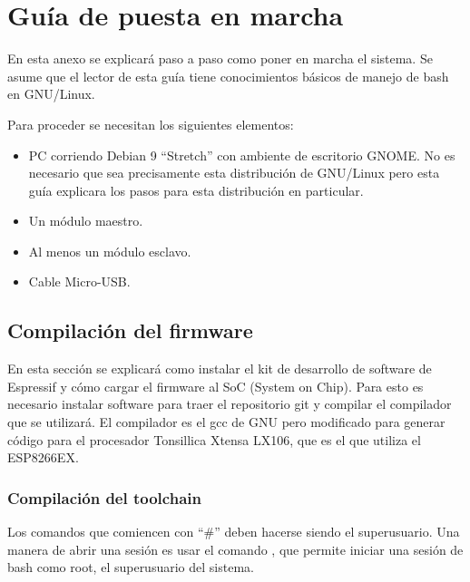 \lstset {
	numbers=none,
	frame=none
}
\setcounter{figure}{0}
\section{Guía de puesta en marcha}
En esta anexo se explicará paso a paso como poner en marcha el sistema. Se asume que el lector de esta guía tiene conocimientos básicos de manejo de bash en GNU/Linux.

Para proceder se necesitan los siguientes elementos:
\begin{itemize}
	\item PC corriendo Debian 9 \enquote{Stretch} con ambiente de escritorio GNOME. No es necesario que sea precisamente esta distribución de GNU/Linux pero esta guía explicara los pasos para esta distribución en particular.
	\item Un módulo maestro.
	\item Al menos un módulo esclavo.
	\item Cable Micro-USB.
\end{itemize}

\subsection{Compilación del firmware}\label{sec:comp-firmware}
En esta sección se explicará como instalar el kit de desarrollo de software de Espressif y cómo cargar el firmware al SoC (System on Chip). Para esto es necesario instalar software para traer el repositorio git y compilar el compilador que se utilizará. El compilador es el gcc de GNU pero modificado para generar código para el procesador Tonsillica Xtensa LX106, que es el que utiliza el ESP8266EX.

\subsubsection{Compilación del toolchain}
Los comandos que comiencen con \enquote{\#} deben hacerse siendo el superusuario. Una manera de abrir una sesión es usar el comando , que permite iniciar una sesión de bash como root, el superusuario del sistema.

